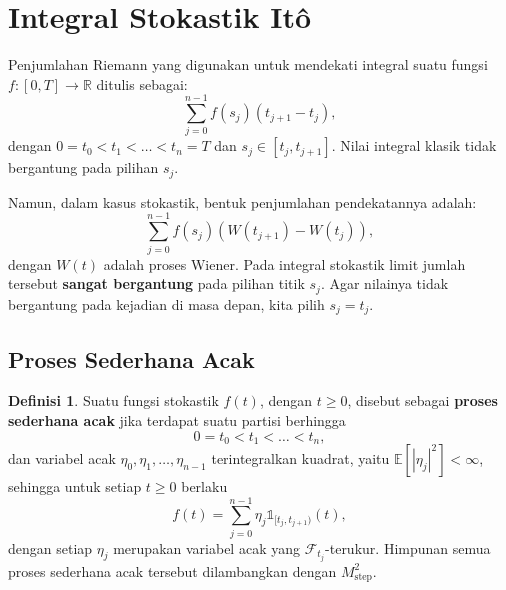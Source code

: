 \documentclass[aspectratio=169,11pt]{beamer}
\theoremstyle{definition}
\newtheorem{definisi}{Definisi}
\newcommand{\R}{\mathbb{R}}
\begin{document}
\section{Integral Stokastik Itô}

\begin{frame}{\insertsection}
  Penjumlahan Riemann yang digunakan untuk mendekati integral suatu fungsi $f : [0, T] \to \R$ ditulis sebagai:
  \begin{equation*}
    \sum_{j=0}^{n-1} f(s_j)(t_{j+1} - t_j),
  \end{equation*}
  dengan $0 = t_0 < t_1 < \dots < t_n = T$ dan $s_j \in [t_j, t_{j+1}]$. Nilai integral klasik tidak bergantung pada pilihan $s_j$.
  \vspace{0.3cm}

  Namun, dalam kasus stokastik, bentuk penjumlahan pendekatannya adalah:
  \begin{equation*}
    \sum_{j=0}^{n-1} f(s_j)(W(t_{j+1}) - W(t_j)),
  \end{equation*}
  dengan $W(t)$ adalah proses Wiener. Pada integral stokastik limit jumlah tersebut \textbf{sangat bergantung} pada pilihan titik $s_j$. Agar nilainya tidak bergantung pada kejadian di masa depan, kita pilih $s_j = t_j$.
\end{frame}

\subsection{Proses Sederhana Acak}
\begin{frame}{\insertsection}{\insertsubsection}
  \begin{definisi}
    Suatu fungsi stokastik $f(t)$, dengan $t \geq 0$, disebut sebagai \textbf{proses sederhana acak} jika terdapat suatu partisi berhingga
    \begin{equation*}
      0 = t_0 < t_1 < \dots < t_n,
    \end{equation*}
    dan variabel acak $\eta_0, \eta_1, \dots, \eta_{n-1}$ terintegralkan kuadrat, yaitu $\mathbb{E}[|\eta_j|^2] < \infty$, sehingga untuk setiap $t \geq 0$ berlaku
    \begin{equation*}
      f(t) = \sum_{j=0}^{n-1} \eta_j \mathds{1}_{[t_j, t_{j+1})}(t),
    \end{equation*}
    dengan setiap $\eta_j$ merupakan variabel acak yang $\mathcal{F}_{t_j}$-terukur.
    Himpunan semua proses sederhana acak tersebut dilambangkan dengan $M_{\text{step}}^2$.
  \end{definisi}
\end{frame}
\end{document}
